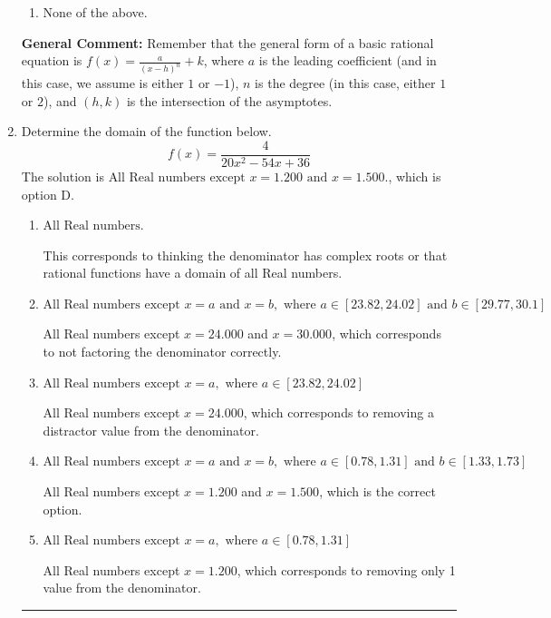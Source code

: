 \documentclass{extbook}[14pt]
\newcommand{\litem}[1]{\item #1

\rule{\textwidth}{0.4pt}}
\begin{document}
\begin{enumerate}
{\begin{enumerate}[label=\Alph*.]
\item None of the above.\end{enumerate}
\textbf{General Comment:} Remember that the general form of a basic rational equation is $ f(x) = \frac{a}{(x-h)^n} + k$, where $a$ is the leading coefficient (and in this case, we assume is either $1$ or $-1$), $n$ is the degree (in this case, either $1$ or $2$), and $(h, k)$ is the intersection of the asymptotes.
}
\litem{
Determine the domain of the function below.
\[ f(x) = \frac{4}{20x^{2} -54 x + 36} \]The solution is \( \text{All Real numbers except } x = 1.200 \text{ and } x = 1.500. \), which is option D.\begin{enumerate}[label=\Alph*.]
\item \( \text{All Real numbers.} \)

This corresponds to thinking the denominator has complex roots or that rational functions have a domain of all Real numbers.
\item \( \text{All Real numbers except } x = a \text{ and } x = b, \text{ where } a \in [23.82, 24.02] \text{ and } b \in [29.77, 30.1] \)

All Real numbers except $x = 24.000$ and $x = 30.000$, which corresponds to not factoring the denominator correctly.
\item \( \text{All Real numbers except } x = a, \text{ where } a \in [23.82, 24.02] \)

All Real numbers except $x = 24.000$, which corresponds to removing a distractor value from the denominator.
\item \( \text{All Real numbers except } x = a \text{ and } x = b, \text{ where } a \in [0.78, 1.31] \text{ and } b \in [1.33, 1.73] \)

All Real numbers except $x = 1.200$ and $x = 1.500$, which is the correct option.
\item \( \text{All Real numbers except } x = a, \text{ where } a \in [0.78, 1.31] \)

All Real numbers except $x = 1.200$, which corresponds to removing only 1 value from the denominator.
\end{enumerate}

}
\end{enumerate}
\end{document}
